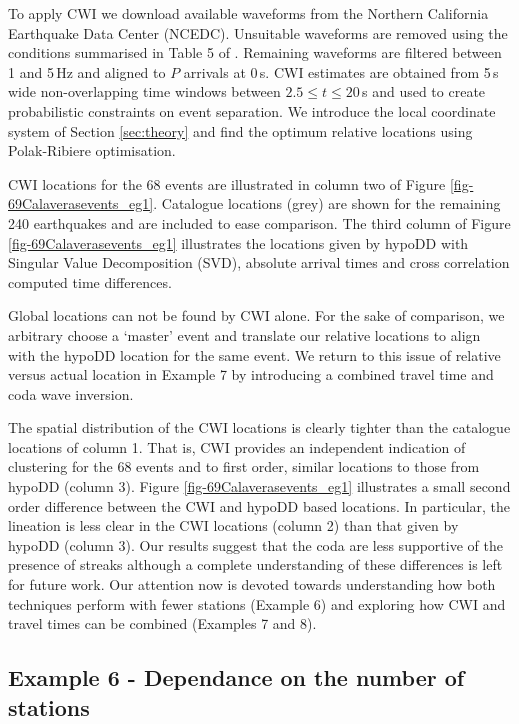 \documentclass[extra]{gji}
\begin{document}
To apply CWI we download available waveforms 
from the Northern California Earthquake Data Center
(NCEDC). Unsuitable waveforms are removed
using the conditions summarised in Table 5 of
\citet{dr_Robinson11a}. Remaining waveforms are filtered between
1 and 5\,Hz and aligned  to $P$ arrivals at 0\,s. CWI estimates are
obtained from 5\,s wide non-overlapping time windows between $2.5
\leq t \leq 20$\,s and used to create probabilistic constraints on
event separation. We introduce the local coordinate system of
Section \ref{sec:theory} and find the optimum relative locations using 
Polak-Ribiere optimisation.

CWI locations for the 68 events are illustrated in column two of
Figure \ref{fig-69Calaverasevents_eg1}. Catalogue locations (grey)
are shown for the remaining 240 earthquakes and are included to ease
comparison. The third column of Figure
\ref{fig-69Calaverasevents_eg1} illustrates the locations given by
hypoDD with Singular Value Decomposition (SVD), absolute arrival
times and cross correlation computed time differences.

Global locations can not be found by CWI alone. 
For the sake of comparison, we arbitrary choose a
`master' event and translate our relative locations to align with the hypoDD
location for the same event. We return to this issue of relative
versus actual location in Example 7 by introducing a combined travel
time and coda wave inversion.

The spatial distribution of the CWI locations is clearly tighter
than the catalogue locations of column 1. That is, CWI provides an
independent indication of clustering for the 68 events and to first
order, similar locations to those from hypoDD (column 3). Figure 
\ref{fig-69Calaverasevents_eg1}
illustrates a small second order difference between
the CWI and hypoDD based locations. In particular, the lineation is
less clear in the CWI locations (column 2) than that given by
hypoDD (column 3). Our results suggest that the coda are less
supportive of the presence of streaks although a complete
understanding of these differences is left for future work. Our
attention now is devoted towards understanding how both techniques
perform with fewer stations (Example 6) and exploring how CWI and 
travel times can be combined (Examples 7 and 8).


\subsection{Example 6 - Dependance on the number of stations}
\end{document}
